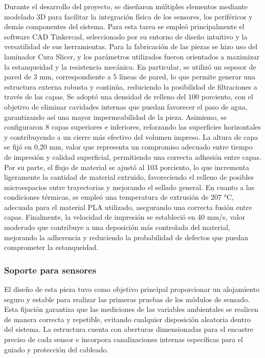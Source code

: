 Durante el desarrollo del proyecto, se diseñaron múltiples elementos mediante modelado 3D para facilitar la integración física de los sensores, los periféricos y demás componentes del sistema. Para esta tarea se empleó principalmente el software CAD Tinkercad, seleccionado por su entorno de diseño intuitivo y la versatilidad de sus herramientas.
Para la fabricación de las piezas se hizo uso del laminador Cura Slicer, y los parámetros utilizados fueron orientados a maximizar la estanqueidad y la resistencia mecánica. En particular, se utilizó un espesor de pared de 3 mm, correspondiente a 5 líneas de pared, lo que permite generar una estructura externa robusta y continúa, reduciendo la posibilidad de filtraciones a través de las capas.
Se adoptó una densidad de relleno del 100 porciento, con el objetivo de eliminar cavidades internas que puedan favorecer el paso de agua, garantizando así una mayor impermeabilidad de la pieza. Asimismo, se configuraron 8 capas superiores e inferiores, reforzando las superficies horizontales y contribuyendo a un cierre más efectivo del volumen impreso.
La altura de capa se fijó en 0,20 mm, valor que representa un compromiso adecuado entre tiempo de impresión y calidad superficial, permitiendo una correcta adhesión entre capas. Por su parte, el flujo de material se ajustó al 103 porciento, lo que incrementa ligeramente la cantidad de material extruido, favoreciendo el relleno de posibles microespacios entre trayectorias y mejorando el sellado general.
En cuanto a las condiciones térmicas, se empleó una temperatura de extrusión de 207 °C, adecuada para el material PLA utilizado, asegurando una correcta fusión entre capas. Finalmente, la velocidad de impresión se estableció en 40 mm/s, valor moderado que contribuye a una deposición más controlada del material, mejorando la adherencia y reduciendo la probabilidad de defectos que puedan comprometer la estanqueidad.

\subsubsection{Soporte para sensores} 
El diseño de esta pieza tuvo como objetivo principal proporcionar un alojamiento seguro y estable para realizar las primeras pruebas de los módulos de sensado. Esta fijación garantiza que las mediciones de las variables ambientales se realicen de manera correcta y repetible, evitando cualquier disposición aleatoria dentro del sistema. La estructura cuenta con aberturas dimensionadas para el encastre preciso de cada sensor e incorpora canalizaciones internas específicas para el guiado y protección del cableado.

